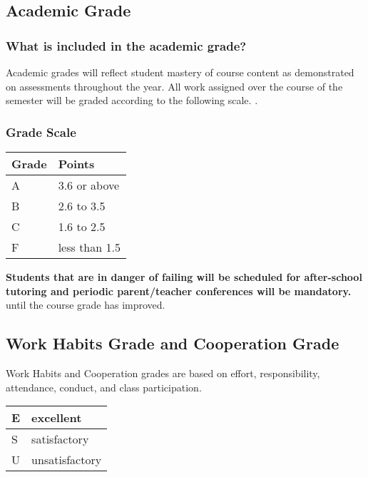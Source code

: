\documentclass[11pt]{article}
\begin{document}
\subsection{Academic Grade}
\label{sec:orge2c4b59}
\subsubsection{What is included in the academic grade?}
\label{sec:org1b62fc2}
Academic grades will reflect student mastery of course content as demonstrated on assessments throughout the year. All work assigned over the course of the semester will be graded according to the following scale.
. 
\subsubsection{Grade Scale}
\label{sec:org37cf9a5}

\begin{center}
\begin{tabular}{ll}
\hline
Grade & Points\\[0pt]
\hline
A & 3.6 or above\\[0pt]
\hline
B & 2.6 to 3.5\\[0pt]
\hline
C & 1.6 to 2.5\\[0pt]
\hline
F & less than 1.5\\[0pt]
\hline
\end{tabular}
\end{center}

\textbf{\textbf{Students that are in danger of failing will be scheduled for after-school tutoring and periodic parent/teacher conferences will be mandatory.}} until the course grade has improved.

\subsection{Work Habits Grade and Cooperation Grade}
\label{sec:org103e3c9}

Work Habits and Cooperation grades are based on effort, responsibility, attendance, conduct, and class participation. 
\begin{center}
\begin{tabular}{ll}
\hline
E & excellent\\[0pt]
\hline
S & satisfactory\\[0pt]
\hline
U & unsatisfactory\\[0pt]
\hline
\end{tabular}
\end{center}
\end{document}

